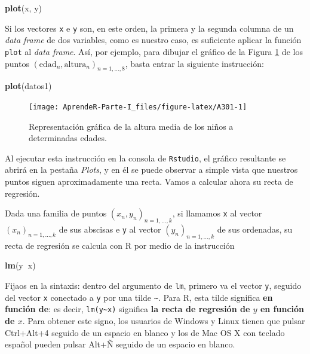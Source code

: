 \documentclass[]{book}
\newenvironment{Shaded}{\begin{snugshade}}{\end{snugshade}}
\newcommand{\KeywordTok}[1]{\textcolor[rgb]{0.13,0.29,0.53}{\textbf{#1}}}
\newcommand{\NormalTok}[1]{#1}
\newcommand{\OperatorTok}[1]{\textcolor[rgb]{0.81,0.36,0.00}{\textbf{#1}}}
\theoremstyle{definition}
\theoremstyle{definition}
\theoremstyle{definition}
\theoremstyle{remark}
\begin{document}
\begin{Shaded}
\begin{Highlighting}[]
\KeywordTok{plot}\NormalTok{(x, y)}
\end{Highlighting}
\end{Shaded}

Si los vectores \texttt{x} e \texttt{y} son, en este orden, la primera y la segunda columna de un \emph{data frame} de dos variables, como es nuestro caso, es suficiente aplicar la función \texttt{plot} al \emph{data frame}.
Así, por ejemplo, para dibujar el gráfico de la Figura \ref{fig:A301} de los puntos \((\mathrm{edad}_n,\textrm{altura}_n)_{n=1,\ldots,8}\), basta entrar la siguiente instrucción:

\begin{Shaded}
\begin{Highlighting}[]
\KeywordTok{plot}\NormalTok{(datos1)}
\end{Highlighting}
\end{Shaded}

\begin{figure}

{\centering \texttt{[image: AprendeR-Parte-I\_files/figure-latex/A301-1]} 

}

\caption{Representación gráfica de la altura media de los niños a determinadas edades.}\label{fig:A301}
\end{figure}

Al ejecutar esta instrucción en la consola de \texttt{Rstudio}, el gráfico resultante se abrirá en la pestaña \emph{Plots}, y en él se puede observar a simple vista que nuestros puntos siguen aproximadamente una recta.
Vamos a calcular ahora su recta de regresión.

Dada una familia de puntos \((x_n,y_n)_{n=1,\ldots,k}\), si llamamos \texttt{x} al vector \((x_n)_{n=1,\ldots,k}\) de sus abscisas e \texttt{y} al vector \((y_n)_{n=1,\ldots,k}\) de sus ordenadas, su recta de regresión se calcula con R por medio de la instrucción

\begin{Shaded}
\begin{Highlighting}[]
\KeywordTok{lm}\NormalTok{(y}\OperatorTok{~}\NormalTok{x)}
\end{Highlighting}
\end{Shaded}

Fijaos en la sintaxis: dentro del argumento de \texttt{lm}, primero va el vector \texttt{y}, seguido del vector \texttt{x} conectado a \texttt{y} por una tilde \texttt{\textasciitilde{}}. Para R, esta tilde significa \textbf{en función de}: es decir, \texttt{lm(y\textasciitilde{}x)} significa \textbf{la recta de regresión de \(y\) en función de \(x\)}. Para obtener este signo, los usuarios de Windows y Linux tienen que pulsar Ctrl+Alt+4 seguido de un espacio en blanco y los de Mac OS X con teclado español pueden pulsar Alt+Ñ seguido de un espacio en blanco.
\end{document}
